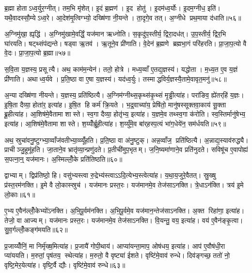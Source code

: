 ब्र॒ह्मा होताऽध्व॒र्युर॒ग्नीत्। तम॒भि मृ॑शेत्। इ॒दं ब्र॒ह्मण॑। इ॒द होतु॑। इ॒दम॑ध्व॒र्योः। इ॒दम॒ग्नीध॒ इति॑। यथै॒वादस्सौ॒म्येऽध्व॒रे। आ॒देश॑मृ॒त्विग्भ्यो॒ दख्षि॑णा नी॒यन्ते। ता॒दृगे॒व तत्। अ॒ग्नीधे प्रथ॒माया द॑धाति॥५६॥

अ॒ग्निमु॑खा॒ ह्यृद्धि॑। अ॒ग्निमु॑खामे॒वर्द्धिं॒ यज॑मान ऋध्नोति। स॒कृदु॑प॒स्तीर्य॒ द्विरा॒दध॑त्। उ॒प॒स्तीर्य॒ द्विर॒भि घा॑रयति। षट्थ्संप॑द्यन्ते। षड्वा ऋ॒तव॑। ऋ॒तूने॒व प्री॑णाति। वे॒देन॑ ब्र॒ह्मणे ब्रह्मभा॒गं परि॑हरति। प्रा॒जा॒प॒त्यो वै वे॒दः। प्रा॒जा॒प॒त्यो ब्र॒ह्मा॥५७॥

स॒वि॒ता य॒ज्ञस्य॒ प्रसूत्यै। अथ॒ काम॑म॒न्येन॑। ततो॒ होत्रे। मध्य॒व्वाँ ए॒तद्य॒ज्ञस्य॑। यद्धोता। म॒ध्य॒त ए॒व य॒ज्ञं प्री॑णाति। अथाध्व॒र्यवे। प्र॒ति॒ष्ठा वा ए॒षा य॒ज्ञस्य॑। यद॑ध्व॒र्युः। तस्माद्धविर्य॒ज्ञस्यै॒तामे॒वावृत॒मनु॑॥५८॥

अ॒न्या दख्षि॑णा नीयन्ते। य॒ज्ञस्य॒ प्रति॑ष्ठित्यै। अ॒ग्निम॑ग्नीथ्स॒कृथ्स॑कृ॒थ्सं मृ॒ड्ढीत्या॑ह। परा॑ङिव॒ ह्ये॑तर्‌हि॑ य॒ज्ञः। इ॒षि॒ता दैव्या॒ होता॑र॒ इत्या॑ह। इ॒षि॒त हि कर्म॑ क्रि॒यते। भ॒द्र॒वाच्या॑य॒ प्रेषि॑तो॒ मानु॑षस्सूक्तवा॒काय॑ सू॒क्ता ब्रू॒हीत्या॑ह। आ॒शिष॑मे॒वैतामा शास्ते। स्व॒गा दैव्या॒ होतृ॑भ्य॒ इत्या॑ह। य॒ज्ञमे॒व तथ्स्व॒गा क॑रोति। स्व॒स्तिर्मानु॑षेभ्य॒ इत्या॑ह। आ॒शिष॑मे॒वैतामा शास्ते। श॒य्योँर्ब्रू॒हीत्या॑ह। श॒य्युँमे॒व बा॑र्‌हस्प॒त्यं भा॑ग॒धेये॑न॒ सम॑र्धयति॥५९॥\anuvakamend[च॒र॒त्य॒ध्व॒र्युः प्रजा॑तिर्ह्वयते॒ वेदाब्रवीद्बर्‌हि॒षद॑ङ्करोत्यृ॒त्विजो॑ दधाति ब्र॒ह्माऽनु॑करोति च॒त्वारि॑ च]

अथ॒ स्रुचा॑वनु॒ष्टुग्भ्या॒व्वाँज॑वतीभ्या॒व्व्यूँ॑हति। प्र॒ति॒ष्ठा वा अ॑नु॒ष्टुक्। अन्न॒व्वाँज॒ प्रति॑ष्ठित्यै। अ॒न्नाद्य॒स्याव॑रुद्ध्यै। प्राचीञ्जु॒हूमू॑हति। जा॒ताने॒व भ्रातृ॑व्या॒न्प्रणु॑दते। प्र॒तीची॑मुप॒भृतम्। ज॒नि॒ष्यमा॑णाने॒व प्रति॑नुदते। सविषू॑च ए॒वापोह्य॑ स॒पत्ना॒न्॒ यज॑मानः। अ॒स्मिल्लोँ॒के प्रति॑तिष्ठति॥६०॥

द्वाभ्याम्। द्विप्र॑तिष्ठो॒ हि। वसु॑भ्यस्त्वा रु॒द्रेभ्य॑स्त्वाऽऽदि॒त्येभ्य॒स्त्वेत्या॑ह। य॒था॒य॒जुरे॒वैतत्। स्रु॒ख्षु प्र॑स्त॒रम॑नक्ति। इ॒मे वै लो॒कास्स्रुच॑। यज॑मानः प्रस्त॒रः। यज॑मानमे॒व तेज॑साऽनक्ति। त्रे॒धाऽन॑क्ति। त्रय॑ इ॒मे लो॒काः॥६१॥

ए॒भ्य ए॒वैन॑ल्लोँ॒केभ्यो॑ऽनक्ति। अ॒भि॒पू॒र्वम॑नक्ति। अ॒भि॒पू॒र्वमे॒व यज॑मान॒न्तेज॑साऽनक्ति। अ॒क्त रिहा॑णा॒ इत्या॑ह। तेजो॒ वा आज्यम्। यज॑मानः प्रस्त॒रः। यज॑मानमे॒व तेज॑साऽनक्ति। वि॒यन्तु॒ वय॒ इत्या॑ह। वय॑ ए॒वैन॑ङ्कृ॒त्वा। सु॒व॒र्गल्लोँ॒कङ्ग॑मयति॥६२॥

प्र॒जाय्योँनिं॒ मा निर्मृ॑ख्ष॒मित्या॑ह। प्र॒जायै॑ गोपी॒थाय॑। आप्या॑यन्ता॒माप॒ ओष॑धय॒ इत्या॑ह। आप॑ ए॒वौष॑धी॒रा प्या॑ययति। म॒रुतां॒ पृष॑तय॒ स्थेत्या॑ह। म॒रुतो॒ वै वृष्ट्या॑ ईशते। वृष्टि॑मे॒वाव॑ रुन्धे। दिव॑ङ्गच्छ॒ ततो॑ नो॒ वृष्टि॒मेर॒येत्या॑ह। वृष्टि॒र्वै द्यौः। वृष्टि॑मे॒वाव॑ रुन्धे॥६३॥

